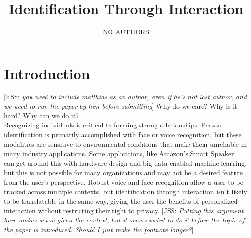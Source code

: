 \documentclass[conference]{IEEEtran}
\title{Identification Through Interaction}
\author{NO AUTHORS} %
\date{\vspace{-1em}}
\newcommand{\elaine}[1]{{\textcolor[rgb]{0.1,0.4,0.6}{[ESS: {\it #1}]}}}
\newcommand{\meta}[1]{{\textcolor[rgb]{0.1,0.7,0.2}{[JSS: {\it #1}]}}}
\begin{document}
\maketitle


\section{Introduction}
\elaine{you need to include matthias as an author, even if he's not last author, and we need to run the paper by him before submitting}
Why do we care? Why is it hard? Why can we do it?\\

Recognizing individuals is critical to forming strong relationships. Person identification is primarily accomplished with face or voice recognition, but these modalities are sensitive to environmental conditions that make them unreliable in many industry applications. Some applications, like Amazon's Smart Speaker, can get around this with hardware design and big-data enabled machine learning, but this is not possible for many organizations and may not be a desired feature from the user's perspective. Robust voice and face recognition allow a user to be tracked across multiple contexts, but identification through interaction isn't likely to be translatable in the same way, giving the user the benefits of personalized interaction without restricting their right to privacy. \meta{Putting this argument here makes sense given the context, but it seems weird to do it before the topic of the paper is introduced. Should I just make the footnote longer?}

\end{document}
